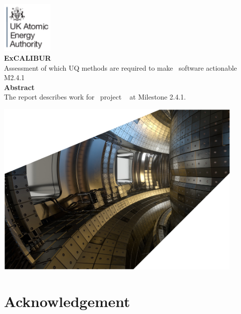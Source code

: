 \documentclass[11pt,twoside,a4paper]{article}
\newcommand{\culhamtitle}{\LARGE Assessment of which UQ methods are required to make 
\nep\ software actionable  \\[1.0\baselineskip] M2.4.1 }%
\begin{document}
\begin{titlepage}%
\vspace*{-30mm}%
\includegraphics[width=2.5cm]{../corpics/cofaplus} \\[2.0\baselineskip]%
{\LARGE {\textbf{\textsf{ExCALIBUR}}}}\\[2.0\baselineskip]%
{\LARGE \culhamtitle } \\[2.0\baselineskip]%
{\textbf{\textsf{Abstract}}}\\%
The report describes work for \exc \ project \nep \ %
at Milestone 2.4.1. %
\vfill%
\centerline{\includegraphics[width=0.9\textwidth]{../corpics/tokintcrop}}%
\end{titlepage}%



\clearpage

\clearpage
\section*{Acknowledgement}\label{sec:ackn}




\end{document}
